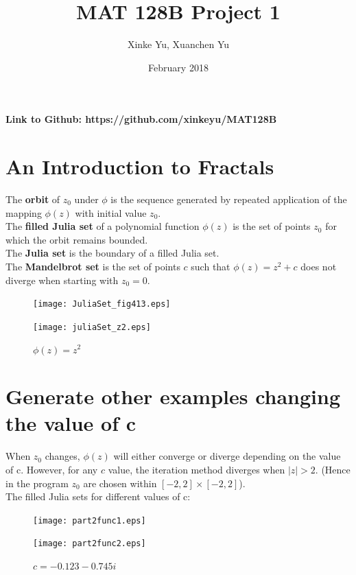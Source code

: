 \documentclass{article}
\title{MAT 128B Project 1}
\author{Xinke Yu, Xuanchen Yu}
\date{February 2018}
\begin{document}
\maketitle
\textbf{Link to Github: https://github.com/xinkeyu/MAT128B}
\section{An Introduction to Fractals}
The \textbf{orbit}  of $z_0$ under $\phi$ is the sequence generated by repeated application of the mapping $\phi (z)$ with initial value $z_0$.\\
The \textbf{filled Julia set} of a polynomial function $\phi(z)$ is the set of points $z_0$ for which the orbit remains bounded.\\
The \textbf{Julia set} is the boundary of a filled Julia set.\\
The \textbf{Mandelbrot set} is the set of points $c$ such that $\phi(z) = z^2 + c$ does not diverge when starting with $z_0 = 0$.\\
\begin{figure}[!hbp]
  \centering
  \begin{minipage}[b]{0.45\textwidth}
    \texttt{[image: JuliaSet\_fig413.eps]}
    \caption{$\phi(z)=z^2-1.25$}
  \end{minipage}
  \hfill
  \begin{minipage}[b]{0.45\textwidth}
    \texttt{[image: juliaSet\_z2.eps]}
    \caption{$\phi(z)=z^2$}
  \end{minipage}
\end{figure}


\section{Generate other examples changing the value of c}
When $z_0$ changes, $\phi(z)$ will either converge or diverge depending on the value of c. However, for any $c$ value, the iteration method diverges when $|z|> 2$. (Hence in the program $z_0$ are chosen within $[-2,2]\times[-2,2]$).\\
The filled Julia sets for different values of c:\\
\begin{figure}[H]
  \centering
  \begin{minipage}[b]{0.45\textwidth}
    \texttt{[image: part2func1.eps]}
    \caption{$c = 0.36 + 0.1i$}
  \end{minipage}
  \hfill
  \begin{minipage}[b]{0.45\textwidth}
    \texttt{[image: part2func2.eps]}
    \caption{$c = -0.123 - 0.745i$}
  \end{minipage}
   \end{figure}
   
\end{document}
